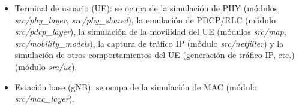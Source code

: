 \documentclass[12pt]{report} %
\begin{document}

\begin{itemize}
\item {
	Terminal de usuario (UE):
	se ocupa de la simulación de PHY (módulos \textit{src/phy\_layer}, \textit{src/phy\_shared}),
	la emulación de PDCP/RLC (módulo \textit{src/pdcp\_layer}),
	la simulación de la movilidad del UE (módulos \textit{src/map}, \textit{src/mobility\_models}),
	la captura de tráfico IP (módulo \textit{src/netfilter})
	y la simulación de otros comportamientos del UE (generación de tráfico IP, etc.) (módulo \textit{src/ue}).
}
\item {
	Estación base (gNB):
	se ocupa de la simulación de MAC (módulo \textit{src/mac\_layer}).
}
\end{itemize}
\end{document}
